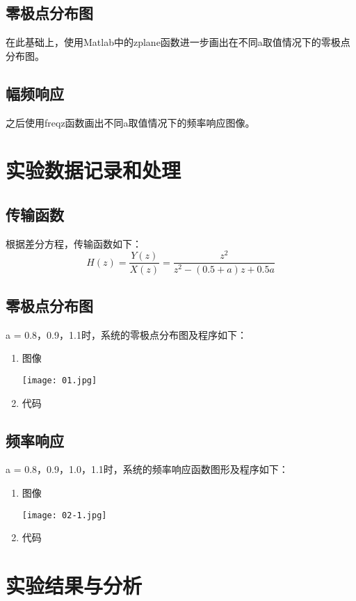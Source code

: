 \documentclass{zjureport}
\begin{document}
  \subsection{零极点分布图}
    在此基础上，使用Matlab中的zplane函数进一步画出在不同a取值情况下的零极点分布图。
  \subsection{幅频响应}
    之后使用freqz函数画出不同a取值情况下的频率响应图像。

\section{实验数据记录和处理}
  \subsection{传输函数}
    根据差分方程，传输函数如下：
    $$H(z) = \frac{Y(z)}{X(z)} = \frac{z^2}{z^2-(0.5+a)z+0.5a}$$
  \subsection{零极点分布图}
    a = 0.8，0.9，1.1时，系统的零极点分布图及程序如下：
    \begin{enumerate}
      \item 图像
      \begin{center}
        \texttt{[image: 01.jpg]}
      \end{center}
      \item 代码
      
    \end{enumerate}

  \subsection{频率响应}
    a = 0.8，0.9，1.0，1.1时，系统的频率响应函数图形及程序如下：
    \begin{enumerate}
      \item 图像
      \begin{center}
        \texttt{[image: 02-1.jpg]}
      \end{center}
      \item 代码
      
    \end{enumerate}

\section{实验结果与分析}
\end{document}
